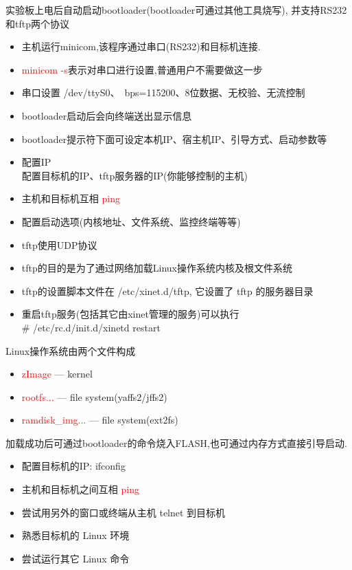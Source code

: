 实验板上电后自动启动bootloader(bootloader可通过其他工具烧写),
并支持RS232和tftp两个协议
\begin{itemize}
  \item 主机运行minicom,该程序通过串口(RS232)和目标机连接.
  \item \textcolor{red}{minicom -s}表示对串口进行设置,普通用户不需要做这一步
  \item 串口设置 /dev/ttyS0、~bps=115200、8位数据、无校验、无流控制
  \item bootloader启动后会向终端送出显示信息
  \item bootloader提示符下面可设定本机IP、宿主机IP、引导方式、启动参数等
\end{itemize}
\endslide

\begin{itemize}
  \item 配置IP\\
        配置目标机的IP、tftp服务器的IP(你能够控制的主机)
  \item 主机和目标机互相 \textcolor{red}{ping}
  \item 配置启动选项(内核地址、文件系统、监控终端等等)
\end{itemize}
\endslide

\begin{itemize}
  \item tftp使用UDP协议
  \item tftp的目的是为了通过网络加载Linux操作系统内核及根文件系统
  \item tftp的设置脚本文件在 /etc/xinet.d/tftp, 它设置了 tftp 的服务器目录
  \item 重启tftp服务(包括其它由xinet管理的服务)可以执行\\
        \# /etc/rc.d/init.d/xinetd restart
\end{itemize}
\endslide

Linux操作系统由两个文件构成
\begin{itemize}
  \item \textcolor{red}{zImage} --- kernel
  \item \textcolor{red}{rootfs...}  --- file system(yaffs2/jffs2)
  \item \textcolor{red}{ramdisk\_img...}  --- file system(ext2fs)
\end{itemize}
加载成功后可通过bootloader的命令烧入FLASH,也可通过内存方式直接引导启动.
\endslide

\begin{itemize}
  \item 配置目标机的IP: ifconfig
  \item 主机和目标机之间互相 \textcolor{red}{ping}
  \item 尝试用另外的窗口或终端从主机 telnet 到目标机
  \item 熟悉目标机的 Linux 环境
  \item 尝试运行其它 Linux 命令
\end{itemize}
\endslide

